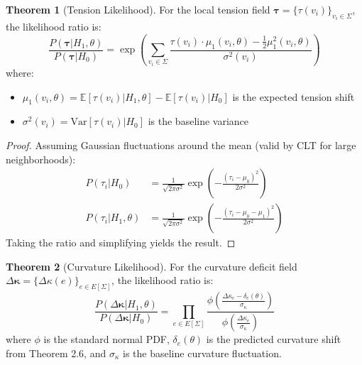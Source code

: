 \documentclass[12pt,a4paper]{article}
\theoremstyle{definition}
\newtheorem{theorem}{Theorem}[section]
\theoremstyle{remark}
\begin{document}
\begin{theorem}[Tension Likelihood]
\label{thm:tension-likelihood}
For the local tension field $\boldsymbol{\tau} = \{\tau(v_i)\}_{v_i \in \Sigma}$, the likelihood ratio is:
\begin{equation}
    \boxed{
    \frac{P(\boldsymbol{\tau} | H_1, \theta)}{P(\boldsymbol{\tau} | H_0)} = \exp\left( \sum_{v_i \in \Sigma} \frac{\tau(v_i) \cdot \mu_1(v_i, \theta) - \frac{1}{2}\mu_1^2(v_i, \theta)}{\sigma^2(v_i)} \right)
    }
\end{equation}
where:
\begin{itemize}
    \item $\mu_1(v_i, \theta) = \mathbb{E}[\tau(v_i) | H_1, \theta] - \mathbb{E}[\tau(v_i) | H_0]$ is the expected tension shift
    \item $\sigma^2(v_i) = \text{Var}[\tau(v_i) | H_0]$ is the baseline variance
\end{itemize}
\end{theorem}

\begin{proof}
Assuming Gaussian fluctuations around the mean (valid by CLT for large neighborhoods):
\begin{align}
    P(\tau_i | H_0) &= \frac{1}{\sqrt{2\pi\sigma^2}} \exp\left( -\frac{(\tau_i - \mu_0)^2}{2\sigma^2} \right) \\
    P(\tau_i | H_1, \theta) &= \frac{1}{\sqrt{2\pi\sigma^2}} \exp\left( -\frac{(\tau_i - \mu_0 - \mu_1)^2}{2\sigma^2} \right)
\end{align}
Taking the ratio and simplifying yields the result.
\end{proof}

\begin{theorem}[Curvature Likelihood]
\label{thm:curvature-likelihood}
For the curvature deficit field $\Delta\boldsymbol{\kappa} = \{\Delta\kappa(e)\}_{e \in E[\Sigma]}$, the likelihood ratio is:
\begin{equation}
    \boxed{
    \frac{P(\Delta\boldsymbol{\kappa} | H_1, \theta)}{P(\Delta\boldsymbol{\kappa} | H_0)} = \prod_{e \in E[\Sigma]} \frac{\phi\left( \frac{\Delta\kappa_e - \delta_e(\theta)}{\sigma_\kappa} \right)}{\phi\left( \frac{\Delta\kappa_e}{\sigma_\kappa} \right)}
    }
\end{equation}
where $\phi$ is the standard normal PDF, $\delta_e(\theta)$ is the predicted curvature shift from Theorem 2.6, and $\sigma_\kappa$ is the baseline curvature fluctuation.
\end{theorem}
\end{document}
